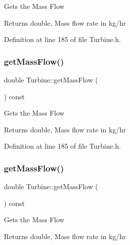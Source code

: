 Gets the Mass Flow

\begin{DoxyReturn}{Returns}
double, Mass flow rate in kg/hr 
\end{DoxyReturn}


Definition at line 185 of file Turbine.\+h.

\mbox{\label{class_turbine_a4893a203dbbf9db9ca77a0b278c4c118}} 
\subsubsection{\texorpdfstring{get\+Mass\+Flow()}{getMassFlow()}\hspace{0.1cm}{\footnotesize\ttfamily [2/3]}}
{\footnotesize\ttfamily double Turbine\+::get\+Mass\+Flow (\begin{DoxyParamCaption}{ }\end{DoxyParamCaption}) const\hspace{0.3cm}{\ttfamily [inline]}}

Gets the Mass Flow

\begin{DoxyReturn}{Returns}
double, Mass flow rate in kg/hr 
\end{DoxyReturn}


Definition at line 185 of file Turbine.\+h.

\mbox{\label{class_turbine_a4893a203dbbf9db9ca77a0b278c4c118}} 
\subsubsection{\texorpdfstring{get\+Mass\+Flow()}{getMassFlow()}\hspace{0.1cm}{\footnotesize\ttfamily [3/3]}}
{\footnotesize\ttfamily double Turbine\+::get\+Mass\+Flow (\begin{DoxyParamCaption}{ }\end{DoxyParamCaption}) const\hspace{0.3cm}{\ttfamily [inline]}}

Gets the Mass Flow

\begin{DoxyReturn}{Returns}
double, Mass flow rate in kg/hr 
\end{DoxyReturn}


